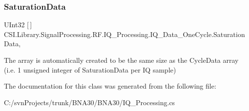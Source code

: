 \subsubsection{\texorpdfstring{SaturationData}{SaturationData}}
{\footnotesize\ttfamily U\+Int32 \mbox{[}$\,$\mbox{]} C\+S\+I.\+Library.\+Signal\+Processing.\+R\+F.\+I\+Q\+\_\+\+Processing.\+I\+Q\+\_\+\+Data\+\_\+\+One\+Cycle.\+Saturation\+Data\hspace{0.3cm}{\ttfamily [get]}, {\ttfamily [set]}}



The array is automatically created to be the same size as the Cycle\+Data array (i.\+e. 1 unsigned integer of Saturation\+Data per IQ sample) 



The documentation for this class was generated from the following file\+:\begin{DoxyCompactItemize}
\item 
C\+:/svn\+Projects/trunk/\+B\+N\+A30/\+B\+N\+A30/I\+Q\+\_\+\+Processing.\+cs\end{DoxyCompactItemize}

